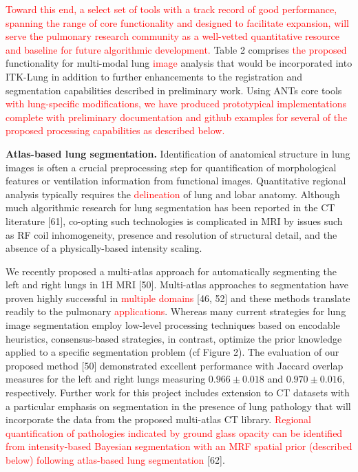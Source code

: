 \documentclass[11pt,]{article}
\begin{document}
\textcolor{red}{
Toward this end, a select set of tools with a track record of good performance, spanning
the range of core functionality and designed to facilitate expansion, will serve the
pulmonary research community
as a well-vetted quantitative resource and baseline for future algorithmic development.}
Table 2 comprises \textcolor{red}{the proposed} functionality for
multi-modal lung \textcolor{red}{image} analysis that would be
incorporated into ITK-Lung in addition to further enhancements to the
registration and segmentation capabilities described in preliminary
work. Using ANTs core tools
\textcolor{red}{with lung-specific modifications,
we have produced prototypical implementations complete with preliminary documentation
and github examples for several of the proposed processing capabilities as described
below.}

\textbf{Atlas-based lung segmentation.} Identification of anatomical
structure in lung images is often a crucial preprocessing step for
quantification of morphological features or ventilation information from
functional images. Quantitative regional analysis typically requires the
\textcolor{red}{delineation} of lung and lobar anatomy. Although much
algorithmic research for lung segmentation has been reported in the CT
literature {[}61{]}, co-opting such technologies is complicated in MRI
by issues such as RF coil inhomogeneity, presence and resolution of
structural detail, and the absence of a physically-based intensity
scaling.

We recently proposed a multi-atlas approach for automatically segmenting
the left and right lungs in 1H MRI {[}50{]}. Multi-atlas approaches to
segmentation have proven highly successful in
\textcolor{red}{multiple domains} {[}46, 52{]} and these methods
translate readily to the pulmonary \textcolor{red}{applications}.
Whereas many current strategies for lung image segmentation employ
low-level processing techniques based on encodable heuristics,
consensus-based strategies, in contrast, optimize the prior knowledge
applied to a specific segmentation problem (cf Figure 2). The evaluation
of our proposed method {[}50{]} demonstrated excellent performance with
Jaccard overlap measures for the left and right lungs measuring
\(0.966\pm0.018\) and \(0.970\pm0.016\), respectively. Further work for
this project includes extension to CT datasets with a particular
emphasis on segmentation in the presence of lung pathology that will
incorporate the data from the proposed multi-atlas CT library.
\textcolor{red}{Regional quantification of
pathologies indicated by ground glass opacity can be identified from intensity-based
Bayesian segmentation with an MRF spatial prior (described below) following
atlas-based lung segmentation} {[}62{]}.
\end{document}
